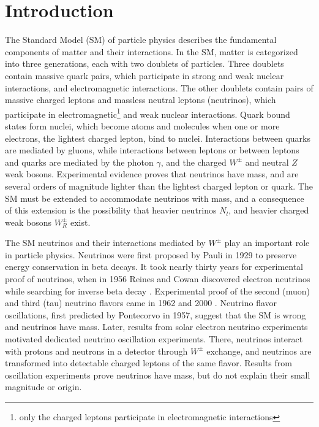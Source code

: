 \chapter{Introduction}
\label{intro_chapter}
The Standard Model (SM) of particle physics describes the fundamental components of matter and their interactions.  
In the SM, matter is categorized into three generations, each with two doublets of particles.  Three doublets 
contain massive quark pairs, which participate in strong and weak nuclear interactions, and electromagnetic interactions.  
The other doublets contain pairs of massive charged leptons and massless neutral leptons (neutrinos), which 
participate in electromagnetic\footnote{only the charged leptons participate in electromagnetic interactions} and weak nuclear interactions.  Quark bound states form nuclei, which become atoms 
and molecules when one or more electrons, the lightest charged lepton, bind to nuclei.  Interactions between quarks 
are mediated by gluons, while interactions between leptons or between leptons and quarks are mediated by the photon $\gamma$, 
and the charged $W^{\pm}$ and neutral $Z$ weak bosons.  Experimental evidence \cite{NOvAresults,mainzPhaseIIResults,t2kResults} 
proves that neutrinos have mass, and are several orders of magnitude lighter than the lightest charged 
lepton or quark.  The SM must be extended to accommodate neutrinos with mass, and a consequence of this extension is the 
possibility that heavier neutrinos $N_{l}$, and heavier charged weak bosons $W^{\pm}_{R}$ exist.

The SM neutrinos and their interactions mediated by $W^{\pm}$ play an important role in particle 
physics.  Neutrinos were first proposed by Pauli in 1929 to preserve energy conservation in beta decays.  It took 
nearly thirty years for experimental proof of neutrinos, when in 1956 Reines and Cowan discovered electron neutrinos while 
searching for inverse beta decay \cite{firstNuDiscovery}.  Experimental proof of the second (muon) and third (tau) neutrino flavors came in 
1962 \cite{muNuDiscovery} and 2000 \cite{tauNuDiscovery}.  Neutrino flavor oscillations, first predicted by Pontecorvo in 1957, suggest that the SM 
is wrong and neutrinos have mass.  Later, results from solar electron neutrino experiments \cite{kamiokandeTwo,solarNuSummary} motivated 
dedicated neutrino oscillation experiments.  There, neutrinos interact with protons and neutrons in a detector through 
$W^{\pm}$ exchange, and neutrinos are transformed into detectable charged leptons of the same flavor.  Results from 
oscillation experiments prove neutrinos have mass, but do not explain their small magnitude or origin.

